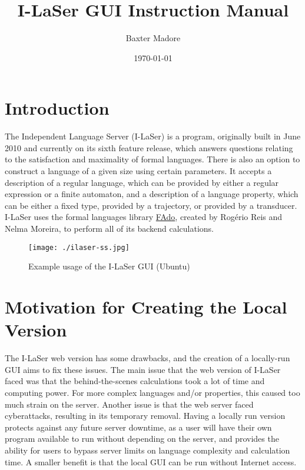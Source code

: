 \documentclass{article}
\title{I-LaSer GUI Instruction Manual}
\author{Baxter Madore}
\date{\today}
\begin{document}
\maketitle
\tableofcontents

\section{Introduction}
\par The Independent Language Server (I-LaSer) is a program, originally built in June 2010 and currently on its sixth feature release, which answers questions relating to the satisfaction and maximality of formal languages. There is also an option to construct a language of a given size using certain parameters. It accepts a description of a regular language, which can be provided by either a regular expression or a finite automaton, and a description of a language property, which can be either a fixed type, provided by a trajectory, or provided by a transducer.
I-LaSer uses the formal languages library \href{https://fado.dcc.fc.up.pt/}{FAdo}\cite{FAdo}, created by Rogério Reis and Nelma Moreira, to perform all of its backend calculations.

\begin{center}
\begin{figure}[htb]
\texttt{[image: ./ilaser-ss.jpg]}
\caption{Example usage of the I-LaSer GUI (Ubuntu)}
\end{figure}
\end{center}

\section{Motivation for Creating the Local Version}
\par The I-LaSer web version has some drawbacks, and the creation of a locally-run GUI aims to fix these issues.
The main issue that the web version of I-LaSer faced was that the behind-the-scenes calculations took a lot of time and computing power. For more complex languages and/or properties, this caused too much strain on the server. Another issue is that the web server faced cyberattacks, resulting in its temporary removal. Having a locally run version protects against any future server downtime, as a user will have their own program available to run without depending on the server, and provides the ability for users to bypass server limits on language complexity and calculation time. A smaller benefit is that the local GUI can be run without Internet access. 
\end{document}
